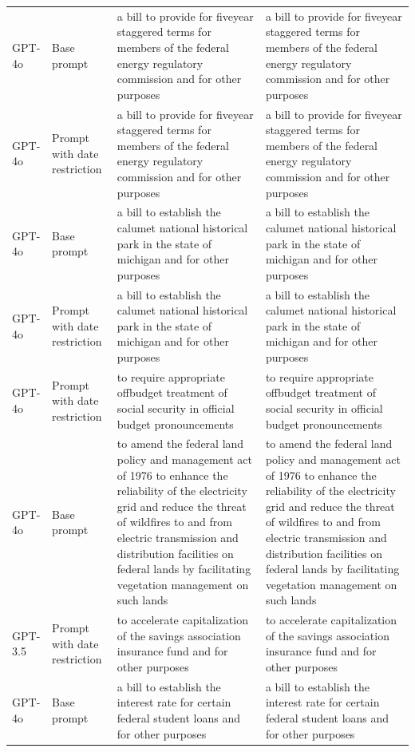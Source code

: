 \begin{longtable}{>{\raggedright\arraybackslash}p{1.4cm}>{\raggedright\arraybackslash}p{1.4cm}>{\raggedright\arraybackslash}p{5.5cm}>{\raggedright\arraybackslash}p{5.5cm}}
GPT-4o & Base prompt & a bill to provide for fiveyear staggered terms for members of the federal energy regulatory commission and for other purposes & a bill to provide for fiveyear staggered terms for members of the federal energy regulatory commission and for other purposes\\
GPT-4o & Prompt with date restriction & a bill to provide for fiveyear staggered terms for members of the federal energy regulatory commission and for other purposes & a bill to provide for fiveyear staggered terms for members of the federal energy regulatory commission and for other purposes\\
GPT-4o & Base prompt & a bill to establish the calumet national historical park in the state of michigan and for other purposes & a bill to establish the calumet national historical park in the state of michigan and for other purposes\\
GPT-4o & Prompt with date restriction & a bill to establish the calumet national historical park in the state of michigan and for other purposes & a bill to establish the calumet national historical park in the state of michigan and for other purposes\\
GPT-4o & Prompt with date restriction & to require appropriate offbudget treatment of social security in official budget pronouncements & to require appropriate offbudget treatment of social security in official budget pronouncements\\
GPT-4o & Base prompt & to amend the federal land policy and management act of 1976 to enhance the reliability of the electricity grid and reduce the threat of wildfires to and from electric transmission and distribution facilities on federal lands by facilitating vegetation management on such lands & to amend the federal land policy and management act of 1976 to enhance the reliability of the electricity grid and reduce the threat of wildfires to and from electric transmission and distribution facilities on federal lands by facilitating vegetation management on such lands\\
GPT-3.5 & Prompt with date restriction & to accelerate capitalization of the savings association insurance fund and for other purposes & to accelerate capitalization of the savings association insurance fund and for other purposes\\
GPT-4o & Base prompt & a bill to establish the interest rate for certain federal student loans and for other purposes & a bill to establish the interest rate for certain federal student loans and for other purposes\\

\end{longtable}
